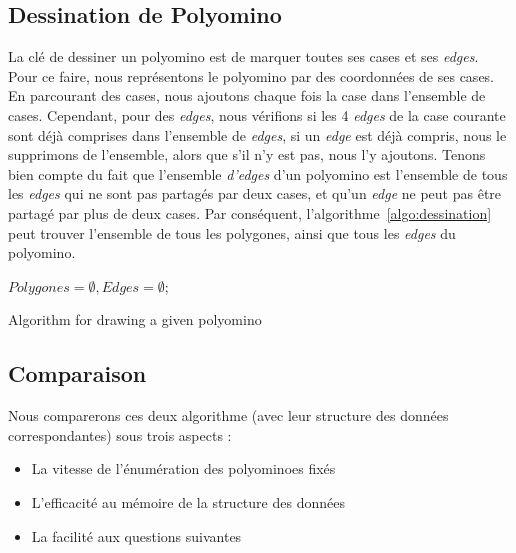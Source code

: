 \documentclass[a4paper,12pt]{article}
\begin{document}
	\subsection{Dessination de Polyomino}
	\par La clé de dessiner un polyomino est de marquer toutes ses cases et ses \textit{edges}. Pour ce faire, nous représentons le polyomino par des coordonnées de ses cases. En parcourant des cases, nous ajoutons chaque fois la case dans l'ensemble de cases. Cependant, pour des \textit{edges}, nous vérifions si les 4 \textit{edges} de la case courante sont déjà comprises dans l'ensemble de \textit{edges}, si un \textit{edge} est déjà compris, nous le supprimons de l'ensemble, alors que s'il n'y est pas, nous l'y ajoutons. Tenons bien compte du fait que l'ensemble  \textit{d'edges} d'un polyomino est l'ensemble de tous les \textit{edges} qui ne sont pas partagés par deux cases, et qu'un \textit{edge} ne peut pas être partagé par plus de deux cases. Par conséquent, l'algorithme~\ref{algo:dessination} peut trouver l'ensemble de tous les polygones, ainsi que tous les \textit{edges} du polyomino.
		\begin{algorithm}
		$Polygones = \emptyset, Edges = \emptyset$;\\
		\caption{Algorithm for drawing a given polyomino}
		\label{algo:dessination}
	\end{algorithm}
	
	\subsection{Comparaison}
	\par Nous comparerons ces deux algorithme (avec leur structure des données correspondantes) sous trois aspects :
	\begin{itemize}
		\item La vitesse de l'énumération des polyominoes fixés
		\item L'efficacité au mémoire de la structure des données
		\item La facilité aux questions suivantes
	\end{itemize}
\end{document}
